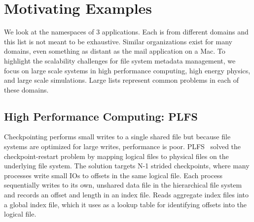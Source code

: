 \section{Motivating Examples}
\label{sec:motivating-examples}

We look at the namespaces of 3 applications.  Each is from different domains
and this list is not meant to be exhaustive. Similar organizations exist for
many domains, even something as distant as the mail application on a Mac. To
highlight the scalability challenges for file system metadata management, we
focus on large scale systems in high performance computing, high energy
physics, and large scale simulations. Large lists represent common problems in
each of these domains.


\subsection{High Performance Computing: PLFS}
\label{sec:plfs}

Checkpointing performs small writes to a single shared file but because file
systems are optimized for large writes, performance is poor.
PLFS~\cite{bent_plfs_2009} solved the checkpoint-restart problem by mapping
logical files to physical files on the underlying file system. The solution
targets N-1 strided checkpoints, where many processes write small IOs to
offsets in the same logical file.  Each process sequentially writes to its own,
unshared data file in the hierarchical file system and records an offset and
length in an index file. Reads aggregate index files into a global index file,
which it uses as a lookup table for identifying offsets into the logical file. 


